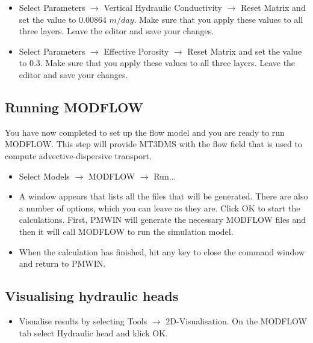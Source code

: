 \begin{itemize}
\item Select Parameters $\rightarrow$ Vertical Hydraulic Conductivity $\rightarrow$ Reset Matrix and set the value to 0.00864 $m/day$. Make sure that you apply these values to all three layers. Leave the editor and save your changes.

\item Select Parameters $\rightarrow$ Effective Porosity $\rightarrow$ Reset Matrix and set the value to 0.3. Make sure that you apply these values to all three layers. Leave the editor and save your changes.

\end{itemize}

\subsection{Running MODFLOW}

You have now completed to set up the flow model and you are ready to run MODFLOW.
This step will provide MT3DMS with the flow field that is used to compute 
advective-dispersive transport.

\begin{itemize}

\item Select Models $\rightarrow$ MODFLOW $\rightarrow$ Run...

\item A window appears that lists all the files that will be generated. There are also a number of options, which you can leave as they are. Click OK to start the calculations. First, PMWIN will generate the necessary MODFLOW files and then it will call MODFLOW to run the
simulation model. 

\item When the calculation has finished, hit any key to close the command window and return to PMWIN.

\end{itemize}

\subsection{Visualising hydraulic heads}

\begin{itemize}

\item Visualise results by selecting Tools $\rightarrow$ 2D-Visualisation. On the MODFLOW tab select Hydraulic head and klick OK.

\end{itemize}

